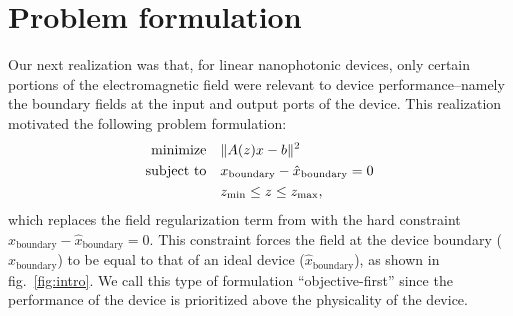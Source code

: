 \section{Problem formulation}
Our next realization was that,
    for linear nanophotonic devices,
    only certain portions of the electromagnetic field were relevant 
    to device performance--namely the boundary fields
    at the input and output ports of the device.
This realization motivated the following problem formulation:
    \begin{subequations}
    \begin{align} 
    \operatorname*{\text{minimize}\quad} & \|A(z)x - b\|^2 \\
    \text{subject to}\quad & x_\text{boundary} - \hat{x}_\text{boundary} = 0 \\
        & z_\text{min} \le z \le z_\text{max},
    \end{align} \label{ob1 problem}
    \end{subequations}
    which replaces the field regularization term from 
    with the hard constraint $x_\text{boundary} - \hat{x}_\text{boundary} = 0$.
This constraint forces the field at the device boundary ($x_\text{boundary}$)
    to be equal to that of an ideal device ($\hat{x}_\text{boundary}$),
    as shown in fig.~\ref{fig:intro}.
We call this type of formulation ``objective-first''
    since the performance of the device is prioritized above
    the physicality of the device.

